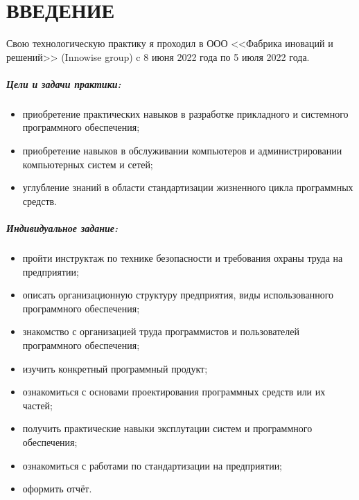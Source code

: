 \newpage
{}
\section*{ВВЕДЕНИЕ}

Свою технологическую практику я проходил в ООО <<Фабрика иноваций и решений>>
(Innowise group) c 8 июня 2022 года по 5 июля 2022 года.

\subparagraph{Цели и задачи практики:} \hspace{0pt}

\begin{itemize}
  \item приобретение практических навыков в разработке прикладного и системного программного обеспечения;
  \item приобретение навыков в обслуживании компьютеров и администрировании компьютерных систем и сетей;
  \item углубление знаний в области стандартизации жизненного цикла программных средств.
\end{itemize}

\subparagraph{Индивидуальное задание:} \hspace{0pt}

\begin{itemize}
  \item пройти инструктаж по технике безопасности и требования охраны труда на предприятии;
  \item описать организационную структуру предприятия, виды использованного программного обеспечения;
  \item знакомство с организацией труда программистов и пользователей программного обеспечения;
  \item изучить конкретный программный продукт;
  \item ознакомиться с основами проектирования программных средств или их частей;
  \item получить практические навыки эксплутации систем и программного обеспечения;
  \item ознакомиться с работами по стандартизации на предприятии;
  \item оформить отчёт.
\end{itemize}
